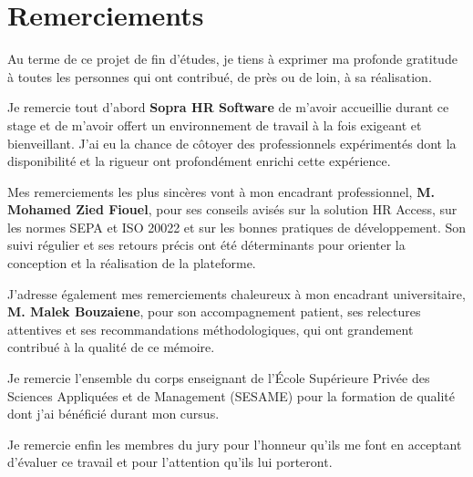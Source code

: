 \chapter*{Remerciements}

Au terme de ce projet de fin d'études, je tiens à exprimer ma profonde gratitude à toutes les personnes qui ont contribué, de près ou de loin, à sa réalisation.

Je remercie tout d'abord \textbf{Sopra HR Software} de m'avoir accueillie durant ce stage et de m'avoir offert un environnement de travail à la fois exigeant et bienveillant. J'ai eu la chance de côtoyer des professionnels expérimentés dont la disponibilité et la rigueur ont profondément enrichi cette expérience.

Mes remerciements les plus sincères vont à mon encadrant professionnel, \textbf{M. Mohamed Zied Fiouel}, pour ses conseils avisés sur la solution HR Access, sur les normes SEPA et ISO 20022 et sur les bonnes pratiques de développement. Son suivi régulier et ses retours précis ont été déterminants pour orienter la conception et la réalisation de la plateforme.

J'adresse également mes remerciements chaleureux à mon encadrant universitaire, \textbf{M. Malek Bouzaiene}, pour son accompagnement patient, ses relectures attentives et ses recommandations méthodologiques, qui ont grandement contribué à la qualité de ce mémoire.

Je remercie l'ensemble du corps enseignant de l'École Supérieure Privée des Sciences Appliquées et de Management (SESAME) pour la formation de qualité dont j'ai bénéficié durant mon cursus.

Je remercie enfin les membres du jury pour l'honneur qu'ils me font en acceptant d'évaluer ce travail et pour l'attention qu'ils lui porteront.

\clearpage
